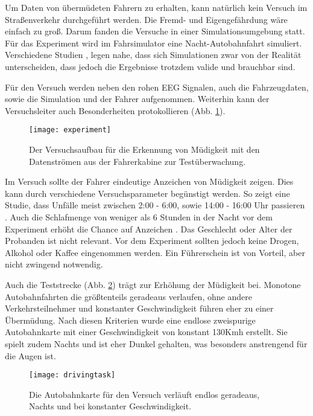 \label{chap:data}
Um Daten von übermüdeten Fahrern zu erhalten, kann natürlich kein Versuch im Straßenverkehr durchgeführt werden. Die Fremd- und Eigengefährdung wäre einfach zu groß. Darum fanden die Versuche in einer Simulationsumgebung statt. Für das Experiment wird im Fahrsimulator eine Nacht-Autobahnfahrt simuliert. Verschiedene Studien \cite{Engstrom_2322937}, \cite{Horne_1757738} legen nahe, dass sich  Simulationen zwar von der Realität unterscheiden, dass jedoch die Ergebnisse trotzdem valide und brauchbar sind.

Für den Versuch werden neben den rohen EEG Signalen, auch die Fahrzeugdaten, sowie die Simulation und der Fahrer aufgenommen. Weiterhin kann der Versuchsleiter auch Besonderheiten protokollieren (Abb. \ref{fig:experiment}).

\begin{figure}[h] 
  \begin{center}
    \texttt{[image: experiment]}
    \caption[Versuchsaufbau Experiment]{Der Versuchsaufbau für die Erkennung von Müdigkeit mit den Datenströmen aus der Fahrerkabine zur Testüberwachung. \label{fig:experiment}}
  \end{center}
\end{figure}

Im Versuch sollte der Fahrer eindeutige Anzeichen von Müdigkeit zeigen. Dies kann durch verschiedene Versuchsparameter begünstigt werden. So zeigt eine Studie, dass Unfälle meist zwischen 2:00 - 6:00, sowie 14:00 - 16:00 Uhr passieren \cite{Horne_1757738}. Auch die Schlafmenge von weniger als 6 Stunden in der Nacht vor dem Experiment erhöht die Chance auf Anzeichen \cite{Engstrom_2322937}. Das Geschlecht oder Alter der Probanden ist nicht relevant. Vor dem Experiment sollten jedoch keine Drogen, Alkohol oder Kaffee eingenommen werden. Ein Führerschein ist von Vorteil, aber nicht zwingend notwendig.

Auch die Teststrecke (Abb. \ref{fig:drivingtask}) trägt zur Erhöhung der Müdigkeit bei. Monotone Autobahnfahrten die größtenteils geradeaus verlaufen, ohne andere Verkehrsteilnehmer und konstanter Geschwindigkeit führen eher zu einer Übermüdung. Nach diesen Kriterien wurde eine endlose zweispurige Autobahnkarte mit einer Geschwindigkeit von konstant 130Kmh erstellt. Sie spielt zudem Nachts und ist eher Dunkel gehalten, was besonders anstrengend für die Augen ist.

\begin{figure}[h] 
  \begin{center}
    \texttt{[image: drivingtask]}
    \caption[Driving Task Screenshot]{Die Autobahnkarte für den Versuch verläuft endlos geradeaus, Nachts und bei konstanter Geschwindigkeit. \label{fig:drivingtask}}
  \end{center}
\end{figure}

